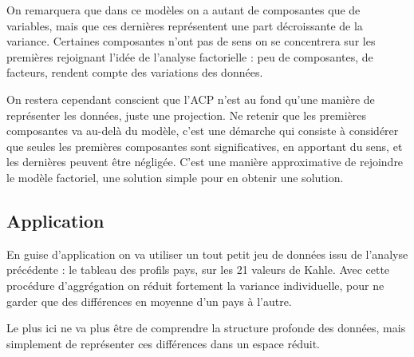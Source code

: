 \documentclass[
]{book}
\newenvironment{Shaded}{\begin{snugshade}}{\end{snugshade}}
\newcommand{\AttributeTok}[1]{\textcolor[rgb]{0.77,0.63,0.00}{#1}}
\newcommand{\CommentTok}[1]{\textcolor[rgb]{0.56,0.35,0.01}{\textit{#1}}}
\newcommand{\ConstantTok}[1]{\textcolor[rgb]{0.00,0.00,0.00}{#1}}
\newcommand{\FunctionTok}[1]{\textcolor[rgb]{0.00,0.00,0.00}{#1}}
\newcommand{\NormalTok}[1]{#1}
\newcommand{\OtherTok}[1]{\textcolor[rgb]{0.56,0.35,0.01}{#1}}
\newcommand{\SpecialCharTok}[1]{\textcolor[rgb]{0.00,0.00,0.00}{#1}}
\begin{document}
On remarquera que dans ce modèles on a autant de composantes que de variables, mais que ces dernières représentent une part décroissante de la variance. Certaines composantes n'ont pas de sens on se concentrera sur les premières rejoignant l'idée de l'analyse factorielle : peu de composantes, de facteurs, rendent compte des variations des données.

On restera cependant conscient que l'ACP n'est au fond qu'une manière de représenter les données, juste une projection. Ne retenir que les premières composantes va au-delà du modèle, c'est une démarche qui consiste à considérer que seules les premières composantes sont significatives, en apportant du sens, et les dernières peuvent être négligée. C'est une manière approximative de rejoindre le modèle factoriel, une solution simple pour en obtenir une solution.

\hypertarget{application}{%
\subsection{Application}\label{application}}

En guise d'application on va utiliser un tout petit jeu de données issu de l'analyse précédente : le tableau des profils pays, sur les 21 valeurs de Kahle. Avec cette procédure d'aggrégation on réduit fortement la variance individuelle, pour ne garder que des différences en moyenne d'un pays à l'autre.

Le plus ici ne va plus être de comprendre la structure profonde des données, mais simplement de représenter ces différences dans un espace réduit.

\begin{Shaded}
\end{Shaded}
\end{document}
